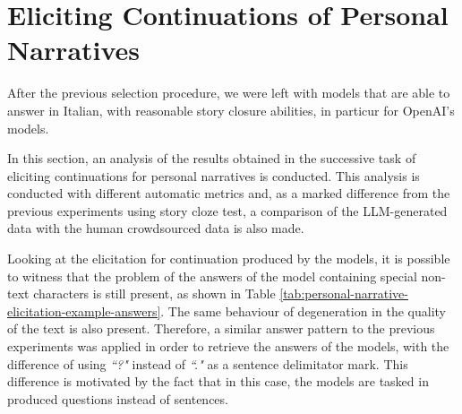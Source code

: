 \section{Eliciting Continuations of Personal Narratives}
\label{cha:methodology-personal-narrative-elicitation-results}
After the previous selection procedure, we were left with models that are able to answer in Italian, with reasonable story closure abilities, in particur for OpenAI's models.

In this section, an analysis of the results obtained in the successive task of eliciting continuations for personal narratives is conducted. This analysis is conducted with different automatic metrics and, as a marked difference from the previous experiments using story cloze test, a comparison of the LLM-generated data with the human crowdsourced data is also made.


Looking at the elicitation for continuation produced by the models, it is possible to witness that the problem of the answers of the model containing special non-text characters is still present, as shown in Table \ref{tab:personal-narrative-elicitation-example-answers}. The same behaviour of degeneration in the quality of the text is also present. Therefore, a similar answer pattern to the previous experiments was applied in order to retrieve the answers of the models, with the difference of using \emph{``?"} instead of \emph{``."} as a sentence delimitator mark. This difference is motivated by the fact that in this case, the models are tasked in produced questions instead of sentences.
% 


